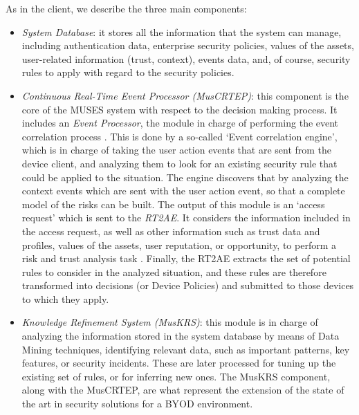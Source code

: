 As in the client, we describe the three main components:
\begin{itemize}
	 \item \textit{System Database}: it stores all the information that the system can manage, including authentication data, enterprise security policies, values of the assets, 
user-related information (trust, context), events data, and, of course, security rules to apply with regard to the security policies.

	 \item \textit{Continuous Real-Time Event Processor (MusCRTEP)}: this component is the core of the MUSES system with respect to the decision making process. It includes an \textit{Event Processor}, the module in charge of performing the event correlation process \cite{deliverable21, deliverable52}. This is done by a so-called `Event correlation engine', which is in charge of taking the user action events that are sent from the device client, and analyzing them to look for an existing security rule that could be applied to the situation. The engine discovers that by analyzing the context events which are sent with the user action event, so that a complete model of the risks can be built. The output of this module is an `access request' which is sent to the \textit{RT2AE}. It considers the information included in the access request, as well as other information such as trust data and profiles, values of the assets, 
user reputation, or opportunity, to perform a risk and trust analysis task \cite{RT2AE_SOTICS13}. Finally, the RT2AE extracts the set of potential rules to consider in the analyzed situation, and these rules are therefore transformed into decisions (or Device Policies) and submitted to those devices to which they apply.

	 \item \textit{Knowledge Refinement System (MusKRS)}: this module is in charge of analyzing the information stored in the system database by means of Data Mining techniques, identifying relevant data, such as important patterns, key features, or security incidents. These are later processed for tuning up the existing set of rules, or for inferring new ones. The MusKRS component, along with the MusCRTEP, are what represent the extension of the state of the art in security solutions for a BYOD environment. 

\end{itemize}

